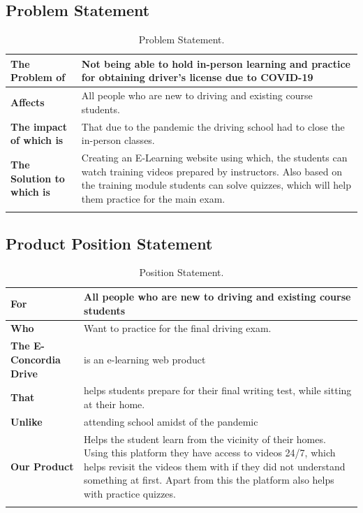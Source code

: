 \documentclass{report}
\begin{document}
\subsection{Problem Statement}

\begin{longtable}{|p{4.5cm}|p{11.5cm}|}
\hline
\textbf{The Problem of} & Not being able to hold in-person learning and practice for obtaining driver's license due to COVID-19 \\ \hline
\textbf{Affects} & All people who are new to driving and existing course students. \\ \hline
\textbf{The impact of which is} & That due to the pandemic the driving school had to close the in-person classes. \\ \hline
\textbf{The Solution to which is} & Creating an E-Learning website using which, the students can watch training videos prepared by instructors. Also based on the training module students can solve quizzes, which will help them practice for the main exam.\\ \hline
\caption{Problem Statement.\label{long}}
\end{longtable}


\subsection{Product Position Statement}

\begin{longtable}{|p{4.5cm}|p{11.5cm}|}
\hline
\textbf{For} & All people who are new to driving and existing course students\\ \hline
\textbf{Who}& Want to practice for the final driving exam.\\ \hline
\textbf{The E-Concordia Drive} & is an e-learning web product\\ \hline
\textbf{That} & helps students prepare for their final writing test, while sitting at their home.\\ \hline
\textbf{Unlike} & attending school amidst of the pandemic \\ \hline
\textbf{Our Product} & Helps the student learn from the vicinity of their homes. Using this platform they have access to videos 24/7, which helps revisit the videos them with if they did not understand something at first. Apart from this the platform also helps with practice quizzes.\\ \hline
\caption{Position Statement.\label{long}}
\end{longtable}
\end{document}
